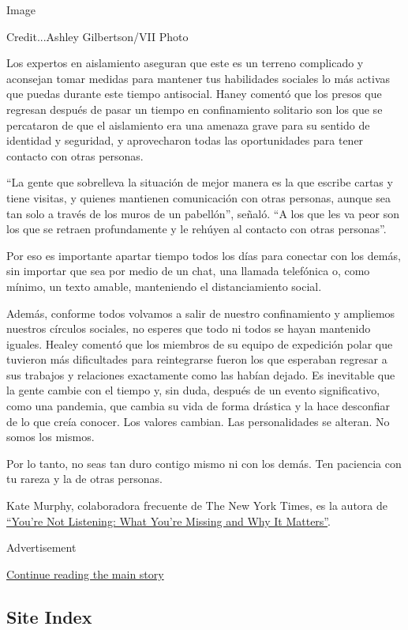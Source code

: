 Image

Credit...Ashley Gilbertson/VII Photo

Los expertos en aislamiento aseguran que este es un terreno complicado y
aconsejan tomar medidas para mantener tus habilidades sociales lo más
activas que puedas durante este tiempo antisocial. Haney comentó que los
presos que regresan después de pasar un tiempo en confinamiento
solitario son los que se percataron de que el aislamiento era una
amenaza grave para su sentido de identidad y seguridad, y aprovecharon
todas las oportunidades para tener contacto con otras personas.

``La gente que sobrelleva la situación de mejor manera es la que escribe
cartas y tiene visitas, y quienes mantienen comunicación con otras
personas, aunque sea tan solo a través de los muros de un pabellón'',
señaló. ``A los que les va peor son los que se retraen profundamente y
le rehúyen al contacto con otras personas''.

Por eso es importante apartar tiempo todos los días para conectar con
los demás, sin importar que sea por medio de un chat, una llamada
telefónica o, como mínimo, un texto amable, manteniendo el
distanciamiento social.

Además, conforme todos volvamos a salir de nuestro confinamiento y
ampliemos nuestros círculos sociales, no esperes que todo ni todos se
hayan mantenido iguales. Healey comentó que los miembros de su equipo de
expedición polar que tuvieron más dificultades para reintegrarse fueron
los que esperaban regresar a sus trabajos y relaciones exactamente como
las habían dejado. Es inevitable que la gente cambie con el tiempo y,
sin duda, después de un evento significativo, como una pandemia, que
cambia su vida de forma drástica y la hace desconfiar de lo que creía
conocer. Los valores cambian. Las personalidades se alteran. No somos
los mismos.

Por lo tanto, no seas tan duro contigo mismo ni con los demás. Ten
paciencia con tu rareza y la de otras personas.

Kate Murphy, colaboradora frecuente de The New York Times, es la autora
de \href{https://us.macmillan.com/books/9781250297198}{``You're Not
Listening: What You're Missing and Why It Matters''}.

Advertisement

\protect\hyperlink{after-bottom}{Continue reading the main story}

\hypertarget{site-index}{%
\subsection{Site Index}\label{site-index}}

